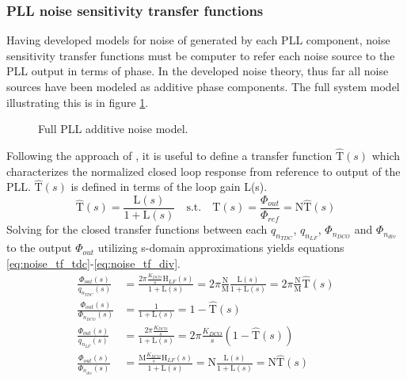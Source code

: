 \subsubsection{PLL noise sensitivity transfer functions}
	Having developed models for noise of generated by each PLL component, noise sensitivity transfer functions must be computer to refer each noise source to the PLL output in terms of phase. In the developed noise theory, thus far all noise sources have been modeled as additive phase components. The full system model illustrating this is in figure \ref{fig:full_pll_noise}.
	\begin{figure}[htb!]
		\center
		\caption{Full PLL additive noise model.}
		\label{fig:full_pll_noise}
	\end{figure}
	\FloatBarrier
	Following the approach of \cite{perrott_2002}, it is useful to define a transfer function $\hat{\mathrm{T}}(s)$ which characterizes the normalized closed loop response from reference to output of the PLL. $\hat{\mathrm{T}}(s)$ is defined in terms of the loop gain L(s).
	\begin{equation}
	\hat{\mathrm{T}}(s) = \frac{\mathrm{L}(s)}{1+\mathrm{L}(s)}\hspace{1em} \text{s.t.} \hspace{1em} \mathrm{T}(s) = \frac{\Phi_{out}}{\Phi_{ref}} = \mathrm{N}\hat{\mathrm{T}}(s) 
	\end{equation}
	Solving for the closed transfer functions between each $q_{n_{TDC}}$, $q_{n_{LF}}$, $\Phi_{n_{DCO}}$ and $\Phi_{n_{div}}$ to the output $\Phi_{out}$ utilizing s-domain approximations yields equations \ref{eq:noise_tf_tdc}-\ref{eq:noise_tf_div}.
	\begin{align}
		\frac{\Phi_{out}(s)}{q_{n_{TDC}}(s)} & = \frac{2\pi\frac{K_{DCO}}{s}\mathrm{H}_{LF}(s)}{1+\mathrm{L}(s)}= 2\pi\frac{\mathrm{N}}{\mathrm{M}}\frac{\mathrm{L}(s)}{1+\mathrm{L}(s)} = 2\pi\frac{\mathrm{N}}{\mathrm{M}}\hat{\mathrm{T}}(s)\label{eq:noise_tf_tdc}\\
		\frac{\Phi_{out}(s)}{\Phi_{n_{DCO}}(s)} & = \frac{1}{1+\mathrm{L}(s)}= 1-\hat{\mathrm{T}}(s)\\
		\frac{\Phi_{out}(s)}{q_{n_{LF}}(s)} & = \frac{2\pi\frac{K_{DCO}}{s}}{1+\mathrm{L}(s)} = 2\pi\frac{K_{DCO}}{s}(1-\hat{\mathrm{T}}(s))\\
		\frac{\Phi_{out}(s)}{\Phi_{n_{div}}(s)} & = \frac{\mathrm{M}\frac{K_{DCO}}{s}\mathrm{H}_{LF}(s)}{1+\mathrm{L}(s)}= \mathrm{N}\frac{\mathrm{L}(s)}{1+\mathrm{L}(s)} = \mathrm{N}\hat{\mathrm{T}}(s)\label{eq:noise_tf_div}
	\end{align}


